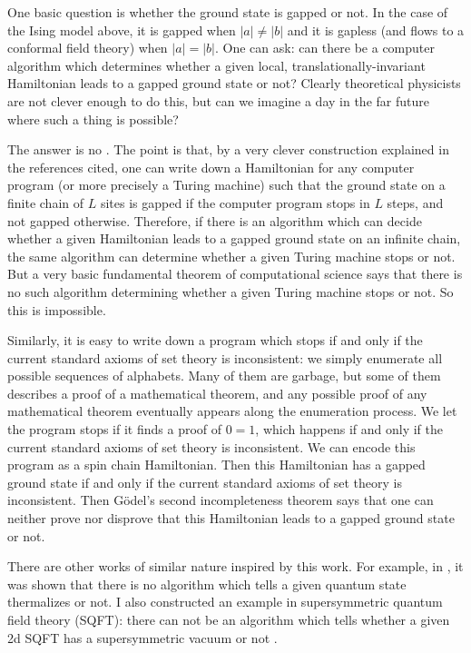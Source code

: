 \documentclass[12pt]{article}
\numberwithin{equation}{section}
\begin{document}
One basic question is whether the ground state is gapped or not. 
In the case of the Ising model above, it is gapped when $|a|\neq |b|$ and it is gapless (and flows to a conformal field theory) when $|a|=|b|$.
One can ask: can there be a computer algorithm
which determines whether a given local, translationally-invariant Hamiltonian leads to a gapped ground state or not?
Clearly theoretical physicists are not clever enough to do this,
but can we imagine a day in the far future where such a thing is possible?

The answer is no \cite{2dNature,2dLong,1d}.
The point is that, by a very clever construction explained in the references cited,
one can write down a Hamiltonian for any computer program (or more precisely a Turing machine)
such that the ground state on a finite chain of $L$ sites is gapped 
if the computer program stops in $L$ steps,
and not gapped otherwise.
Therefore, if there is an algorithm which can decide whether a given Hamiltonian leads to a gapped ground state on an infinite chain,
the same algorithm can determine whether a given Turing machine stops or not.
But a very basic fundamental theorem of computational science says that
there is no such algorithm determining whether a given Turing machine stops or not.
So this is impossible.

Similarly, it is easy to write down a program which stops if and only if the current standard axioms of set theory is inconsistent: 
we simply enumerate all possible sequences of alphabets.
Many of them are garbage, but some of them describes a proof of a mathematical theorem,
and any possible proof of any mathematical theorem eventually appears along the enumeration process.
We let the program stops if it finds a proof of $0=1$, which happens if and only if the current standard axioms of set theory is inconsistent. 
We can encode this program as a spin chain Hamiltonian.
Then this Hamiltonian has a gapped ground state if and only if the current standard axioms of set theory is inconsistent. 
Then G\"odel's second incompleteness theorem says that one can neither prove nor disprove that this Hamiltonian leads to a gapped ground state or not.

There are other works of similar nature inspired by this work.
For example, in \cite{thermalNature,thermalLong}, it was shown that 
there is no algorithm which tells a given quantum state thermalizes or not.
I also constructed an example in supersymmetric quantum field theory (SQFT):
there can not be an algorithm which tells whether a given 2d SQFT has a supersymmetric vacuum or not \cite{Tachikawa:2022vsh}.
\end{document}
